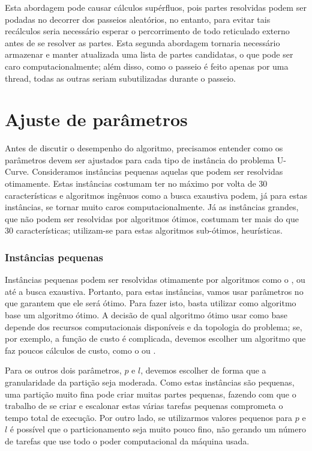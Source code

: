 Esta abordagem pode causar cálculos supérfluos, pois partes resolvidas
podem ser podadas no decorrer dos passeios aleatórios, no entanto, para 
evitar tais recálculos seria necessário esperar o percorrimento de todo
reticulado externo antes de se resolver as partes. Esta segunda 
abordagem tornaria necessário armazenar e manter atualizada uma lista de 
partes candidatas, o que pode ser caro computacionalmente; além disso, 
como o passeio é feito apenas por uma thread, todas as outras seriam
subutilizadas durante o passeio. 


\section{Ajuste de parâmetros}
Antes de discutir o desempenho do algoritmo, precisamos entender como
os parâmetros devem ser ajustados para cada tipo de instância do 
problema U-Curve. Consideramos instâncias pequenas aquelas que podem ser
resolvidas otimamente. Estas instâncias costumam ter no máximo por volta
de 30 características e algoritmos ingênuos como a busca exaustiva 
podem, já para estas instâncias, se tornar muito caros 
computacionalmente. Já as instâncias grandes, que não podem ser 
resolvidas por algoritmos ótimos, costumam ter mais do que 30 
características; utilizam-se para estas algoritmos sub-ótimos, 
heurísticas.

\subsubsection{Instâncias pequenas}
Instâncias pequenas podem ser resolvidas otimamente por algoritmos
como o ,  ou até a busca exaustiva. Portanto, 
para estas instâncias, vamos usar parâmetros no  que 
garantem que ele será ótimo. Para fazer isto, basta utilizar como 
algoritmo base um algoritmo ótimo. A decisão de qual algoritmo ótimo
usar como base depende dos recursos computacionais disponíveis e da 
topologia do problema; se, por exemplo, a função de custo é complicada, 
devemos escolher um algoritmo que faz poucos cálculos de custo, como o 
 ou .

Para os outros dois parâmetros, $p$ e $l$, devemos escolher de forma
que a granularidade da partição seja moderada. Como estas instâncias 
são pequenas, uma partição muito fina pode criar muitas partes pequenas,
fazendo com que o trabalho de se criar e escalonar estas várias tarefas 
pequenas comprometa o tempo total de execução. Por outro lado, se 
utilizarmos valores pequenos para $p$ e $l$ é possível que o 
particionamento seja muito pouco fino, não gerando um número de tarefas
que use todo o poder computacional da máquina usada.

